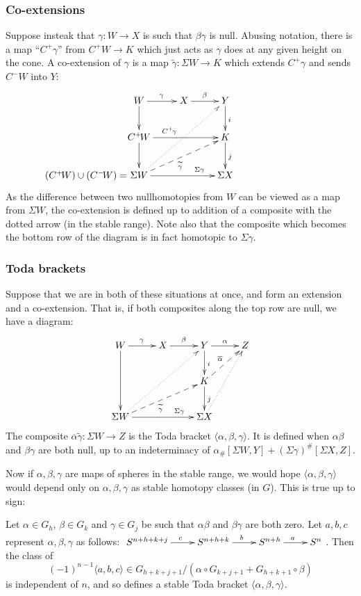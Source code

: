 \documentclass[11pt]{article}
\begin{document}
\subsubsection*{Co-extensions}
Suppose insteak that $\gamma:W\to X$ is such that $\beta\gamma$ is null. Abusing
notation, there is a map ``$C^+\!\gamma$'' from $C^+\!W\to K$ which just acts as
$\gamma$ does at any given height on the cone. A co-extension of $\gamma$ is a
map $\widetilde\gamma:\Sigma W\to K$ which extends $C^+\!\gamma$ and sends
$C^-\!W$ into $Y$:
\[\xymatrix{
\ar[d]W\ar[r]^\gamma&X\ar[r]^\beta&Y\ar[d]^i\\
C^+\!W\ar[d]\ar[rr]^(.35){C^+\!\gamma}&&K\ar[d]^j\\
\makebox[0cm][r]{$(C^+\!W)\cup (C^-\!W)=$\ }\Sigma W
\ar@{-->}[rru]_(.45){\widetilde\gamma}
\ar@{.>}[rruu]\ar[rr]^(.7){\Sigma\gamma}&&\Sigma X
}\]
As the difference between two nullhomotopies from $W$ can be viewed as a map
from $\Sigma W$, the co-extension is defined up to addition of a composite with
the dotted arrow (in the stable range). Note also that the composite which
becomes the bottom row of the diagram is in fact homotopic to $\Sigma\gamma$.
\subsubsection{Toda brackets}
Suppose that we are in both of these situations at once, and form an extension
and a co-extension. That is, if both composites along the top row are null, we
have a diagram:
\[\xymatrix{
\ar[dd]W\ar[r]^\gamma&X\ar[r]^\beta&Y\ar[d]^i\ar[r]^\alpha&Z\\
&&K\ar[d]^j\ar@{-->}[ur]^{\overline\alpha}\\
\Sigma W\ar@{-->}[rru]_(.45){\widetilde\gamma}
\ar@{.>}[rruu]\ar[rr]^(.7){\Sigma\gamma}&&\Sigma X\ar@{.>}[ruu]
}\]
The composite $\overline\alpha\widetilde\gamma:\Sigma W\to Z$ is the Toda
bracket $\langle\alpha,\beta,\gamma\rangle$. It is defined when $\alpha\beta$
and $\beta\gamma$ are both null, up to an indeterminacy of $\alpha_\#[\Sigma
W,Y]+(\Sigma\gamma)^\#[\Sigma X,Z]$.

Now if $\alpha,\beta,\gamma$ are maps of spheres in the stable range, we would
hope $\langle\alpha,\beta,\gamma\rangle$ would depend only on
$\alpha,\beta,\gamma$ as stable homotopy classes (in $G$). This is true up to
sign:
\begin{prop*}
Let $\alpha\in G_h$, $\beta\in G_k$ and $\gamma\in G_j$ be such that
$\alpha\beta$ and $\beta\gamma$ are both zero. Let $a,b,c$ represent
$\alpha,\beta,\gamma$ as follows:
$\xymatrix{
S^{n+h+k+j}\ar[r]^{c}&S^{n+h+k}\ar[r]^{b}&S^{n+h}\ar[r]^{a}&S^{n}
}$. Then the class of 
\[
(-1)^{n-1}\langle a,b,c\rangle\in
G_{h+k+j+1}/\left(\alpha\circ G_{k+j+1}+G_{h+k+1}\circ \beta\right)
\]
is independent of $n$, and so defines a stable Toda bracket
$\langle\alpha,\beta,\gamma\rangle$.
\end{prop*}
\end{document}
